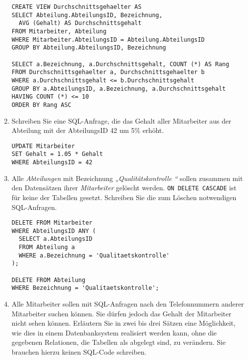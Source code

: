 \documentclass{lehramt-informatik-minimal}
\begin{document}
\begin{enumerate}
\begin{antwort}
\begin{verbatim}
CREATE VIEW Durchschnittsgehaelter AS
SELECT Abteilung.AbteilungsID, Bezeichnung,
  AVG (Gehalt) AS Durchschnittsgehalt
FROM Mitarbeiter, Abteilung
WHERE Mitarbeiter.AbteilungsID = Abteilung.AbteilungsID
GROUP BY Abteilung.AbteilungsID, Bezeichnung

SELECT a.Bezeichnung, a.Durchschnittsgehalt, COUNT (*) AS Rang
FROM Durchschnittsgehaelter a, Durchschnittsgehaelter b
WHERE a.Durchschnittsgehalt <= b.Durchschnittsgehalt
GROUP BY a.AbteilungsID, a.Bezeichnung, a.Durchschnittsgehalt
HAVING COUNT (*) <= 10
ORDER BY Rang ASC
\end{verbatim}
\end{antwort}


\item Schreiben Sie eine SQL-Anfrage, die das Gehalt aller Mitarbeiter
aus der Abteilung mit der AbteilungsID 42 um 5\% erhöht.

\begin{antwort}
\begin{verbatim}
UPDATE Mitarbeiter
SET Gehalt = 1.05 * Gehalt
WHERE AbteilungsID = 42
\end{verbatim}
\end{antwort}


\item Alle \emph{Abteilungen} mit Bezeichnung \emph{„Qualitätskontrolle
“} sollen zusammen mit den Datensätzen ihrer \emph{Mitarbeiter} gelöscht
werden. \verb|ON DELETE CASCADE| ist für keine der Tabellen gesetzt.
Schreiben Sie die zum Löschen notwendigen SQL-Anfragen.

\begin{antwort}
\begin{verbatim}
DELETE FROM Mitarbeiter
WHERE AbteilungsID ANY (
  SELECT a.AbteilungsID
  FROM Abteilung a
  WHERE a.Bezeichnung = 'Qualitaetskontrolle'
);

DELETE FROM Abteilung
WHERE Bezeichnung = 'Qualitaetskontrolle';
\end{verbatim}
\end{antwort}


\item Alle Mitarbeiter sollen mit SQL-Anfragen nach den Telefonnummern
anderer Mitarbeiter suchen können. Sie dürfen jedoch das Gehalt der
Mitarbeiter nicht sehen können. Erläutern Sie in zwei bis drei Sätzen
eine Möglichkeit, wie dies in einem Datenbanksystem realisiert werden
kann, ohne die gegebenen Relationen, die Tabellen als abgelegt sind, zu
verändern. Sie brauchen hierzu keinen SQL-Code schreiben.


\end{enumerate}
\end{document}
